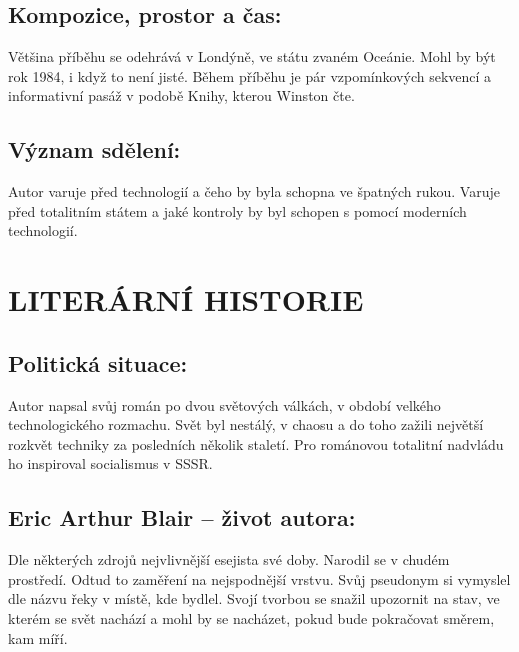 \documentclass{extarticle} %
\begin{document}
\subsection*{Kompozice, prostor a čas:}
\noindent 
Většina příběhu se odehrává v Londýně, ve státu zvaném Oceánie. Mohl by být rok 1984, i když to není jisté. Během příběhu je pár vzpomínkových sekvencí a informativní pasáž v podobě Knihy, kterou Winston čte.

\subsection*{Význam sdělení:}
\noindent
Autor varuje před technologií a čeho by byla schopna ve špatných rukou. Varuje před totalitním státem a jaké kontroly by byl schopen s pomocí moderních technologií. 

\section*{LITERÁRNÍ HISTORIE}

\subsection*{Politická situace:}
Autor napsal svůj román po dvou světových válkách, v období velkého technologického rozmachu. Svět byl nestálý, v chaosu a do toho zažili největší rozkvět techniky za posledních několik staletí. Pro románovou totalitní nadvládu ho inspiroval socialismus v SSSR.




\subsection*{Eric Arthur Blair {\ssmall -- život autora:}}
\noindent 
Dle některých zdrojů nejvlivnější esejista své doby. Narodil se v chudém prostředí. Odtud to zaměření na nejspodnější vrstvu. Svůj pseudonym si vymyslel dle názvu řeky v místě, kde bydlel. Svojí tvorbou se snažil upozornit na stav, ve kterém se svět nachází a mohl by se nacházet, pokud bude pokračovat směrem, kam míří.
\end{document}
